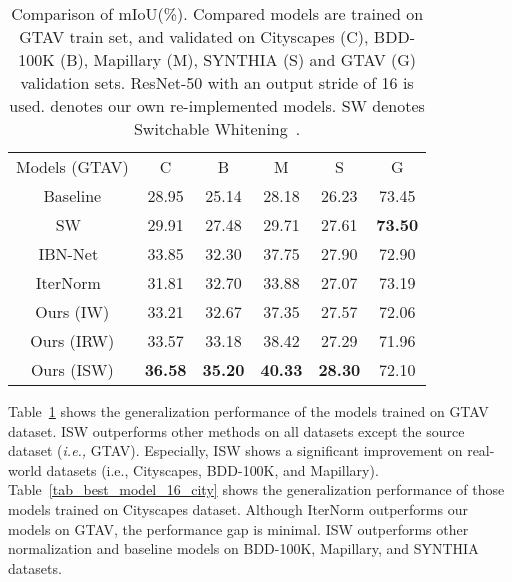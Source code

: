 \documentclass[final]{latex/cvpr}
\newcommand{\drule}{\specialrule{0.2pt}{1pt}{1pt}\specialrule{0.2pt}{0pt}{\belowrulesep}}
\begin{document}
\begin{table}[t!]
\vspace*{-0.0cm}
\begin{center}
\footnotesize
\begin{tabular}{c|c|c|c|c||c}
\toprule
Models (GTAV) & C & B & M & S & G\\
\drule
Baseline  & 28.95        & 25.14      & 28.18      & 26.23      & 73.45 \\ 
\midrule
SW~\cite{pan2019switchable} & 29.91      & 27.48      & 29.71      & 27.61      & \textbf{73.50}     \\ 
\midrule
IBN-Net~\cite{pan2018two}      & 33.85      & 32.30      & 37.75      & 27.90 & 72.90      \\ 
\midrule
IterNorm~\cite{huang2019iterative} & 31.81      & 32.70      & 33.88      & 27.07      & 73.19     \\ 
\midrule
Ours (IW) & 33.21      & 32.67      & 37.35      & 27.57      & 72.06      \\ 
\midrule
Ours (IRW)                   & 33.57      & 33.18      & 38.42      & 27.29      & 71.96      \\ 
\midrule
Ours (ISW)                   & \textbf{36.58}      & \textbf{35.20} & \textbf{40.33} & \textbf{28.30}      & 72.10      \\ 
\bottomrule
\end{tabular}
\end{center}
\vspace*{-0.15cm}
\caption{Comparison of mIoU(\%). Compared models are trained on GTAV train set, and validated on Cityscapes (C), BDD-100K (B), Mapillary (M), SYNTHIA (S) and GTAV (G) validation sets. ResNet-50 with an output stride of 16 is used.
 denotes our own re-implemented models. SW denotes Switchable Whitening~\cite{pan2019switchable}.}
\label{tab_best_model_16_gtav}
\vspace*{-0.53cm}
\end{table}

Table~\ref{tab_best_model_16_gtav} shows the generalization performance of the models trained on GTAV dataset. ISW outperforms other methods on all datasets except the source dataset (\textit{i.e.,} GTAV). Especially, ISW shows a significant improvement on real-world datasets (i.e., Cityscapes, BDD-100K, and Mapillary). Table~\ref{tab_best_model_16_city} shows the generalization performance of those models trained on Cityscapes dataset. 
Although IterNorm outperforms our models on GTAV, the performance gap is minimal. 
ISW outperforms other normalization and baseline models on BDD-100K, Mapillary, and SYNTHIA datasets. 
\end{document}
